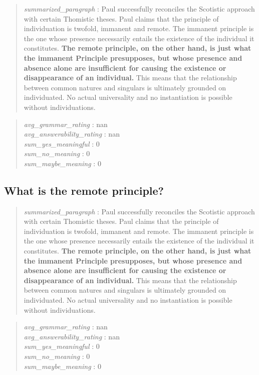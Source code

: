 \begin{quote}
\emph{summarized\_paragraph} : Paul successfully reconciles the
Scotistic approach with certain Thomistic theses. Paul claims that the
principle of individuation is twofold, immanent and remote. The immanent
principle is the one whose presence necessarily entails the existence of
the individual it constitutes. \textbf{The remote principle, on the
other hand, is just what the immanent Principle presupposes, but whose
presence and absence alone are insufficient for causing the existence or
disappearance of an individual.} This means that the relationship
between common natures and singulars is ultimately grounded on
individuated. No actual universality and no instantiation is possible
without individuations.
\end{quote}

\begin{quote}
\emph{avg\_grammar\_rating} : nan\\
\emph{avg\_answerability\_rating} : nan\\
\emph{sum\_yes\_meaningful} : 0\\
\emph{sum\_no\_meaning} : 0\\
\emph{sum\_maybe\_meaning} : 0
\end{quote}

\hypertarget{what-is-the-remote-principle}{%
\subsection{What is the remote
principle?}\label{what-is-the-remote-principle}}

\begin{quote}
\emph{summarized\_paragraph} : Paul successfully reconciles the
Scotistic approach with certain Thomistic theses. Paul claims that the
principle of individuation is twofold, immanent and remote. The immanent
principle is the one whose presence necessarily entails the existence of
the individual it constitutes. \textbf{The remote principle, on the
other hand, is just what the immanent Principle presupposes, but whose
presence and absence alone are insufficient for causing the existence or
disappearance of an individual.} This means that the relationship
between common natures and singulars is ultimately grounded on
individuated. No actual universality and no instantiation is possible
without individuations.
\end{quote}

\begin{quote}
\emph{avg\_grammar\_rating} : nan\\
\emph{avg\_answerability\_rating} : nan\\
\emph{sum\_yes\_meaningful} : 0\\
\emph{sum\_no\_meaning} : 0\\
\emph{sum\_maybe\_meaning} : 0
\end{quote}

